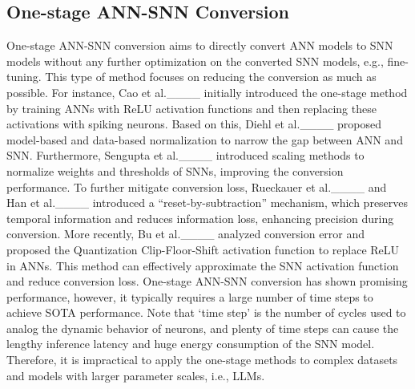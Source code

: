 \subsection{One-stage ANN-SNN Conversion} 
One-stage ANN-SNN conversion aims to directly convert ANN models to SNN models without any further optimization on the converted SNN models, e.g., fine-tuning. This type of method focuses on reducing the conversion as much as possible. For instance, Cao et al.____ initially introduced the one-stage method by training ANNs with ReLU activation functions and then replacing these activations with spiking neurons. Based on this, Diehl et al.____ proposed model-based and data-based normalization to narrow the gap between ANN and SNN. Furthermore, Sengupta et al.____ introduced scaling methods to normalize weights and thresholds of SNNs, improving the conversion performance. To further mitigate conversion loss, Rueckauer et al.____ and Han et al.____ introduced a ``reset-by-subtraction'' mechanism, which preserves temporal information and reduces information loss, enhancing precision during conversion. More recently, Bu et al.____ analyzed conversion error and proposed the Quantization Clip-Floor-Shift activation function to replace ReLU in ANNs. This method can effectively approximate the SNN activation function and reduce conversion loss. One-stage ANN-SNN conversion has shown promising performance, however, it typically requires a large number of time steps to achieve SOTA performance. Note that `time step' is the number of cycles used to analog the dynamic behavior of neurons, and plenty of time steps can cause the lengthy inference latency and huge energy consumption of the SNN model. Therefore, it is impractical to apply the one-stage methods to complex datasets and models with larger parameter scales, i.e., LLMs.




